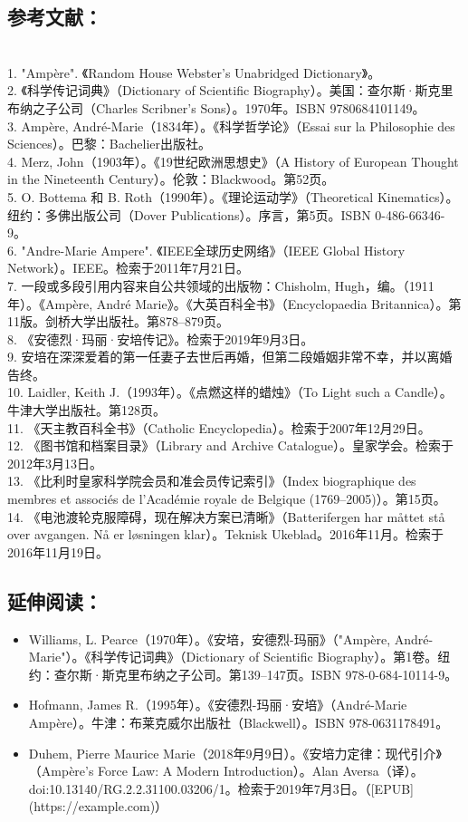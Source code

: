 \subsection{参考文献：}\\
1. "Ampère". 《Random House Webster's Unabridged Dictionary》。\\ 
2. 《科学传记词典》（Dictionary of Scientific Biography）。美国：查尔斯·斯克里布纳之子公司（Charles Scribner's Sons）。1970年。ISBN 9780684101149。\\ 
3. Ampère, André-Marie（1834年）。《科学哲学论》（Essai sur la Philosophie des Sciences）。巴黎：Bachelier出版社。\\ 
4. Merz, John（1903年）。《19世纪欧洲思想史》（A History of European Thought in the Nineteenth Century）。伦敦：Blackwood。第52页。\\
5. O. Bottema 和 B. Roth（1990年）。《理论运动学》（Theoretical Kinematics）。纽约：多佛出版公司（Dover Publications）。序言，第5页。ISBN 0-486-66346-9。\\
6. "Andre-Marie Ampere". 《IEEE全球历史网络》（IEEE Global History Network）。IEEE。检索于2011年7月21日。\\
7. 一段或多段引用内容来自公共领域的出版物：Chisholm, Hugh，编。（1911年）。《Ampère, André Marie》。《大英百科全书》（Encyclopaedia Britannica）。第11版。剑桥大学出版社。第878–879页。\\
8. 《安德烈·玛丽·安培传记》。检索于2019年9月3日。\\
9. 安培在深深爱着的第一任妻子去世后再婚，但第二段婚姻非常不幸，并以离婚告终。\\
10. Laidler, Keith J.（1993年）。《点燃这样的蜡烛》（To Light such a Candle）。牛津大学出版社。第128页。\\
11. 《天主教百科全书》（Catholic Encyclopedia）。检索于2007年12月29日。\\
12. 《图书馆和档案目录》（Library and Archive Catalogue）。皇家学会。检索于2012年3月13日。\\
13. 《比利时皇家科学院会员和准会员传记索引》（Index biographique des membres et associés de l'Académie royale de Belgique (1769–2005)）。第15页。\\
14. 《电池渡轮克服障碍，现在解决方案已清晰》（Batterifergen har måttet stå over avgangen. Nå er løsningen klar）。Teknisk Ukeblad。2016年11月。检索于2016年11月19日。
\subsection{延伸阅读：}
\begin{itemize}
\item Williams, L. Pearce（1970年）。《安培，安德烈-玛丽》（"Ampère, André-Marie"）。《科学传记词典》（Dictionary of Scientific Biography）。第1卷。纽约：查尔斯·斯克里布纳之子公司。第139–147页。ISBN 978-0-684-10114-9。
\item Hofmann, James R.（1995年）。《安德烈-玛丽·安培》（André-Marie Ampère）。牛津：布莱克威尔出版社（Blackwell）。ISBN 978-0631178491。
\item Duhem, Pierre Maurice Marie（2018年9月9日）。《安培力定律：现代引介》（Ampère's Force Law: A Modern Introduction）。Alan Aversa（译）。doi:10.13140/RG.2.2.31100.03206/1。检索于2019年7月3日。（[EPUB](https://example.com)）
\end{itemize}
